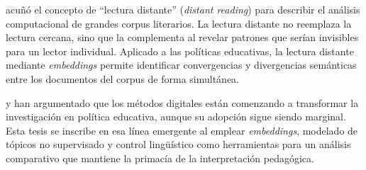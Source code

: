 \citet{moretti2013distant} acuñó el concepto de ``lectura distante'' (\textit{distant reading}) para describir el análisis computacional de grandes corpus literarios. La lectura distante no reemplaza la lectura cercana, sino que la complementa al revelar patrones que serían invisibles para un lector individual. Aplicado a las políticas educativas, la lectura distante mediante \textit{embeddings} permite identificar convergencias y divergencias semánticas entre los documentos del corpus de forma simultánea.

\citet{gulson2019digitizing} y \citet{williamson2017big} han argumentado que los métodos digitales están comenzando a transformar la investigación en política educativa, aunque su adopción sigue siendo marginal. Esta tesis se inscribe en esa línea emergente al emplear \textit{embeddings}, modelado de tópicos no supervisado y control lingüístico como herramientas para un análisis comparativo que mantiene la primacía de la interpretación pedagógica.
